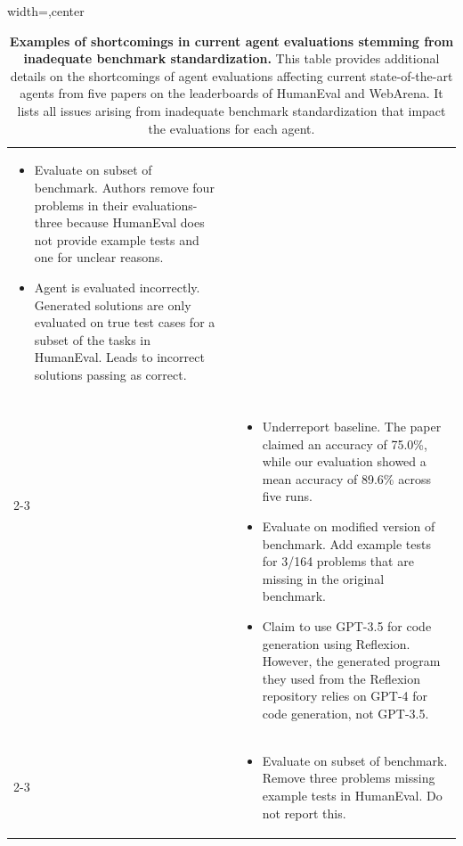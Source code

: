 \documentclass{article}
\begin{document}
\begin{table}[h!]
\begin{adjustbox}{width=\textwidth,center}
\begin{tabular}{p{1.3cm}p{2.4cm}p{7cm}}
{\begin{itemize}[leftmargin=*]
    \item Evaluate on subset of benchmark. Authors remove four problems in their evaluations-three because HumanEval does not provide example tests and one for unclear reasons.
    \item Agent is evaluated incorrectly. Generated solutions are only evaluated on true test cases for a subset of the tasks in HumanEval. Leads to incorrect solutions passing as correct. 
\end{itemize}}
\\[1.3cm]
&&\\[1.1cm]
\cmidrule(rl){2-3}
&\citet{zhong_ldb_2024}&\multirow{4}{7cm}{\vspace{-.4cm}\begin{itemize}[leftmargin=*]
    \item Underreport baseline. The paper claimed an accuracy of 75.0\%, while our evaluation showed a mean accuracy of 89.6\% across five runs.
    \item Evaluate on modified version of benchmark. Add example tests for 3/164 problems that are missing in the original benchmark.
    \item Claim to use GPT-3.5 for code generation using Reflexion. However, the generated program they used from the Reflexion repository relies on GPT-4 for code generation, not GPT-3.5.
\end{itemize}}
\\[0.3cm]
&&
\\[0.3cm]
&&
\\ [0.3cm]
&&
\\[1.7cm]
\cmidrule(rl){2-3} 
&\citet{shinn_reflexion_2023}&
\vspace{-.4cm}\begin{itemize}[leftmargin=*]
    \item Evaluate on subset of benchmark. Remove three problems missing example tests in HumanEval. Do not report this.
\end{itemize}
\\
\end{tabular}
\end{adjustbox}
\caption{\textbf{Examples of shortcomings in current agent evaluations stemming from inadequate benchmark standardization.} This table provides additional details on the shortcomings of agent evaluations affecting current state-of-the-art agents from five papers on the leaderboards of HumanEval and WebArena. It lists all issues arising from inadequate benchmark standardization that impact the evaluations for each agent.} 
  \label{table:reproducibility}
  \vspace{-0.3cm}
\end{table}
\end{document}
